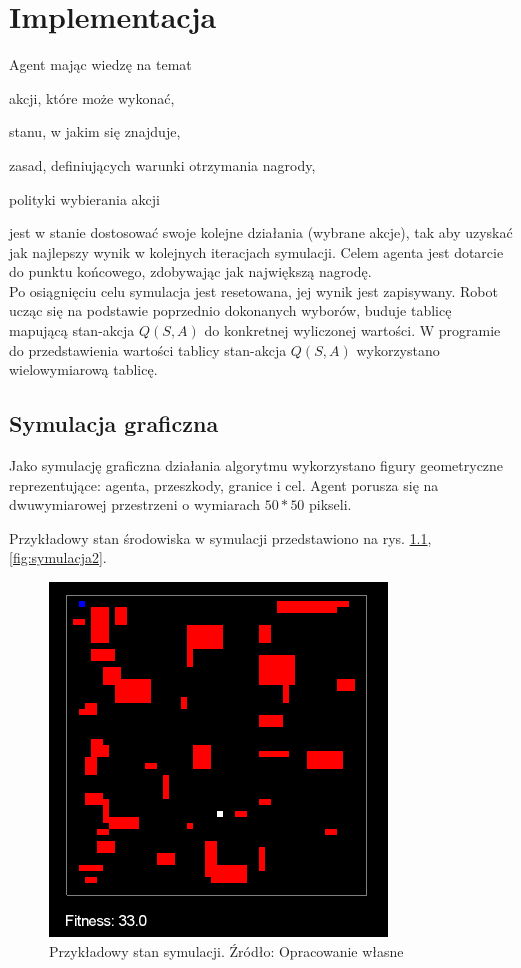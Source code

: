 \chapter{Implementacja}
\label{cha:implementacja}

Agent mając wiedzę na temat
\begin{itemize*}
\renewcommand{\labelitemi}{$\bullet$}
 \item akcji, które może wykonać,
 \item stanu, w jakim się znajduje,
 \item zasad, definiujących warunki otrzymania nagrody,
 \item polityki wybierania akcji
\end{itemize*}
jest w stanie dostosować swoje kolejne działania (wybrane akcje), tak aby uzyskać jak
najlepszy wynik w kolejnych iteracjach symulacji. Celem agenta jest dotarcie do punktu końcowego, zdobywając jak 
największą nagrodę. \\
\indent Po osiągnięciu celu symulacja jest resetowana, jej wynik jest zapisywany. Robot ucząc się na podstawie 
poprzednio dokonanych wyborów, buduje tablicę mapującą stan-akcja $Q(S, A)$ do konkretnej wyliczonej wartości. W 
programie do przedstawienia wartości tablicy stan-akcja $Q(S, A)$ wykorzystano wielowymiarową tablicę.

\section{Symulacja graficzna}
\label{sec:symulacjagraficzna}

Jako symulację graficzna działania algorytmu wykorzystano figury geometryczne reprezentujące: agenta, przeszkody, 
granice i cel.
Agent porusza się na dwuwymiarowej przestrzeni o wymiarach $50*50$ pikseli.

Przykładowy stan środowiska w symulacji przedstawiono na rys. \ref{fig:symulacja}, \ref{fig:symulacja2}.

\begin{figure}[h!]
    \centering
    \includegraphics[scale=0.4]{symulacja}
    \caption{Przykładowy stan symulacji. Źródło: Opracowanie własne}
    \label{fig:symulacja}
\end{figure}

